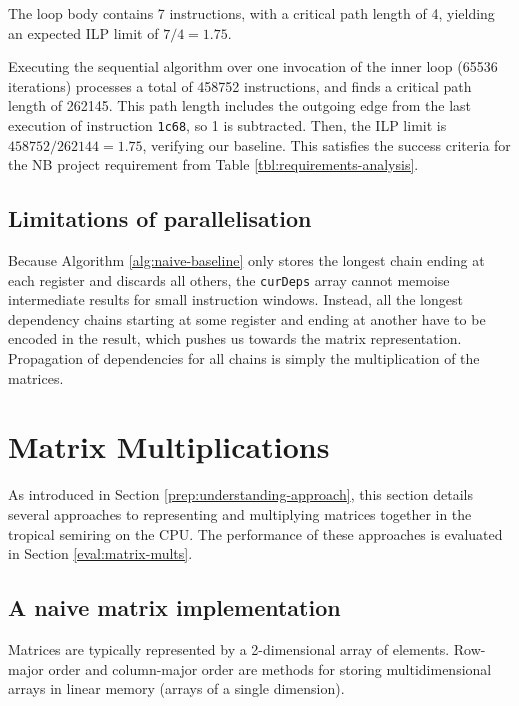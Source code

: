 The loop body contains 7 instructions, with a critical path length of 4, yielding an expected ILP limit of $7/4=1.75$.

Executing the sequential algorithm over one invocation of the inner loop (65536 iterations) processes a total of 458752
instructions, and finds a critical path length of 262145. This path length includes the outgoing edge from the last
execution of instruction \verb|1c68|, so 1 is subtracted. Then, the ILP limit is $458752/262144=1.75$, verifying our 
baseline. This satisfies the success criteria for the NB project requirement from Table \ref{tbl:requirements-analysis}.

\subsection{Limitations of parallelisation}

Because Algorithm \ref{alg:naive-baseline} only stores the longest chain ending at each register and discards all others, the \verb|curDeps|
array cannot memoise intermediate results for small instruction windows. Instead, all the longest dependency chains
starting at some register and ending at another have to be encoded in the result, which pushes us towards the matrix
representation. Propagation of dependencies for all chains is simply the multiplication of the matrices.

\section{Matrix Multiplications} \label{impl:matrices}

As introduced in Section \ref{prep:understanding-approach},
this section details several approaches to representing and multiplying matrices together in the tropical semiring 
on the CPU. The performance of these approaches is evaluated in Section \ref{eval:matrix-mults}.

\subsection{A naive matrix implementation}

Matrices are typically represented by a 2-dimensional array of elements. Row-major order and column-major order are methods 
for storing multidimensional arrays in linear memory (arrays of a single dimension).

\begin{figure}[H]
  \centering
  
\end{figure}

